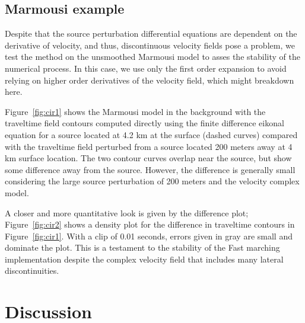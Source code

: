 \subsection{Marmousi example}

Despite  that the source perturbation differential equations are
dependent on the derivative of velocity, and thus, discontinuous
velocity fields pose a problem, we test the method on the unsmoothed
Marmousi model \cite[]{TLE13-09-09270936} to asses the stability of
the numerical process. In this case, we use only the first order
expansion to avoid relying on higher order derivatives of the velocity
field, which might breakdown here.

Figure~\ref{fig:cir1} shows the Marmousi model in the background with
the traveltime field contours computed directly using the finite
difference eikonal equation for a source located at 4.2 km at the
surface (dashed curves) compared with the traveltime field perturbed
from a source located 200 meters away at 4 km surface location. The
two contour curves overlap near the source, but show some difference
away from the source.  However, the difference is generally small
considering the large source perturbation of 200 meters and the
velocity complex model. 



A closer and more quantitative look is given by the difference plot;
Figure~\ref{fig:cir2} shows a density plot for the difference in
traveltime contours in Figure~\ref{fig:cir1}. With a clip of 0.01
seconds, errors given in gray are small and dominate the plot. This is
a testament to the stability of the Fast marching implementation
despite the complex velocity field that includes many lateral
discontinuities.


\section{Discussion}

